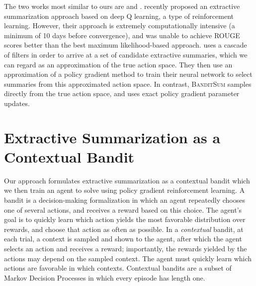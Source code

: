\documentclass[11pt,a4paper]{article}
\newcommand{\B}{\textsc{BanditSum }}
\begin{document}
The two works most similar to ours are \citet{yao2018deep} and \citet{DBLP:Narayan/2018}. \citet{yao2018deep} recently proposed an extractive summarization approach based on deep Q learning, a type of reinforcement learning. However, their approach is extremely computationally intensive (a minimum of 10 days before convergence), and was unable to achieve ROUGE scores better than the best maximum likelihood-based approach. \citet{DBLP:Narayan/2018} uses a cascade of filters in order to arrive at a set of candidate extractive summaries, which we can regard as an approximation of the true action space. They then use an approximation of a policy gradient method to train their neural network to select summaries from this approximated action space. In contrast, \B samples directly from the true action space, and uses exact policy gradient parameter updates. 













































\section{Extractive Summarization as a Contextual Bandit \label{sec:technical}}
Our approach formulates extractive summarization as a contextual bandit which we then train an agent to solve using policy gradient reinforcement learning. A bandit is a decision-making formalization in which an agent repeatedly chooses one of several actions, and receives a reward based on this choice. The agent's goal is to quickly learn which action yields the most favorable distribution over rewards, and choose that action as often as possible. In a \textit{contextual} bandit, at each trial, a context is sampled and shown to the agent, after which the agent selects an action and receives a reward; importantly, the rewards yielded by the actions may depend on the sampled context. The agent must quickly learn which actions are favorable in which contexts. Contextual bandits are a subset of Markov Decision Processes in which every episode has length one.
\end{document}
